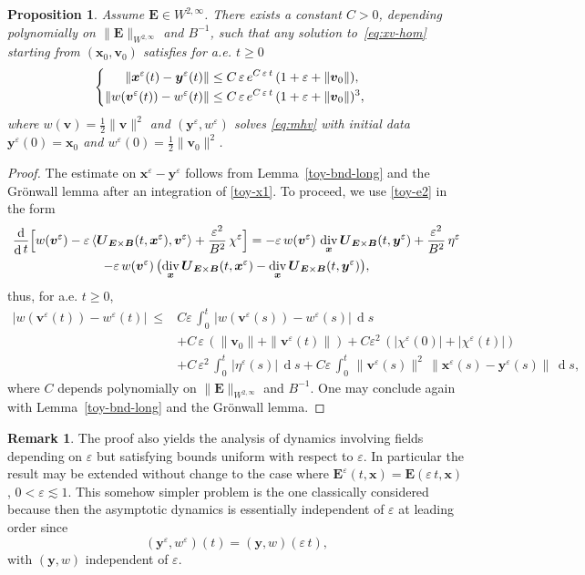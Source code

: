 \documentclass[10pt]{amsart}
\newenvironment{splitcases}
{\begin{cases}\begin{aligned}}
{\end{aligned}\end{cases}}
\let\eps\varepsilon
\DeclareMathOperator\dD{d}\let\dd\dD
\DeclareMathOperator{\Div}{div}
\theoremstyle{plain}
\newtheorem{proposition}[theorem]{Proposition}
\theoremstyle{definition}
\newtheorem{remark}[theorem]{Remark}
\newcommand\br{\begin{remark}}
\newcommand\er{\end{remark}}
\newcommand{\bpr}{\begin{proposition}}
\newcommand{\epr}{\end{proposition}}
\newcommand\bB{{\boldsymbol B}}
\newcommand\bE{{\boldsymbol E}}
\newcommand\bU{{\boldsymbol U}}
\newcommand\bfv{{\boldsymbol v}}
\newcommand\bfx{{\boldsymbol x}}
\newcommand\bfy{{\boldsymbol y}}
\let\e w
\newcommand{\EcB}{\bU_{\bE\times\bB}}
\begin{document}
\bpr
\label{toy-long-xe}
Assume $\bE\in W^{2,\infty}$. There exists a constant $C>0$, depending polynomially on $\|\bE\|_{W^{2,\infty}}$ and $B^{-1}$, such that any solution to~\eqref{eq:xv-hom} starting from $(\bfx_0,\bfv_0)$ satisfies for a.e. $t\geq0$
\[
\begin{splitcases}
\|\bfx^\eps(t)-\bfy^\eps(t)\|
&\leq C\,\eps\,e^{C\,\eps\,t}
\,(1+\eps+\|\bfv_0\|),
\\
\|\e(\bfv^\eps(t))-\e^\eps(t)\| &\leq C\,\eps\,e^{C\,\eps\,t}\,(1+\eps+\|\bfv_0\|)^3,
\end{splitcases}
\]
where $\e(\bfv)=\tfrac12\|\bfv\|^2$ and
$(\bfy^\eps,\e^\eps)$ solves \eqref{eq:mhv} with initial data
$\bfy^\eps(0)=\bfx_0$ and $\e^\eps(0)=\tfrac12\|\bfv_0\|^2$.
\epr
\begin{proof}
The estimate on $\bfx^\eps-\bfy^\eps$ follows from Lemma~\ref{toy-bnd-long} and the Grönwall lemma after an integration of \eqref{toy-x1}. To proceed, we use \eqref{toy-e2} in the form
\begin{multline*}
\frac{\dD}{\dD
t}\Bigl[\e(\bfv^\eps)-\eps\,\langle\EcB(t,\bfx^\eps),\bfv^\eps\rangle+\frac{\eps^2}{B^2}\,\chi^\eps\Bigr]
=-\eps\,\e(\bfv^\eps)\,\Div_\bfx\EcB(t,\bfy^\eps)+\frac{\eps^2}{B^2}\,\eta^\eps
\\
-\eps\,\e(\bfv^\eps)\,\bigl(\Div_\bfx\EcB(t,\bfx^\eps)-\Div_\bfx\EcB(t,\bfy^\eps)\bigr),
\end{multline*}
thus, for a.e. $t\geq0$,
\begin{align*}
|\e(\bfv^\eps(t))-\e^\eps(t)|\
\leq {}&C\eps\,\int_0^t\,|\e(\bfv^\eps(s))-\e^\eps(s)|\,\dD s\,
\\
&+C\,\eps\,(\|\bfv_0\|+\|\bfv^\eps(t)\|)+C\eps^2\,(|\chi^\eps(0)|+|\chi^\eps(t)|)\,
\\
& +C\,\eps^2\,\int_0^t\,|\eta^\eps(s)|\,\dD s
+C\eps\,\int_0^t\,\|\bfv^\eps(s)\|^2\,\|\bfx^\eps(s)-\bfy^\eps(s)\|\,\dD s,
\end{align*}
where $C$ depends polynomially on $\|\bE\|_{W^{2,\infty}}$ and $B^{-1}$. One may conclude again with Lemma~\ref{toy-bnd-long} and the Grönwall lemma.
\end{proof}

\br
\label{rk:toy-scaled-time}
The proof also yields the analysis of dynamics involving fields depending on $\eps$ but satisfying bounds uniform with respect to $\eps$. In particular the result may be extended without change to the case where $\bE^\eps(t,\bfx)=\bE(\eps\,t,\bfx)$, $0<\eps\lesssim 1$. This somehow simpler problem is the one classically considered because then the asymptotic dynamics is essentially independent of $\eps$ at leading order since
\[
(\bfy^\eps,\e^\eps)(t)=(\bfy,\e)(\eps\,t),
\]
with $(\bfy,\e)$ independent of $\eps$.
\er
\end{document}
